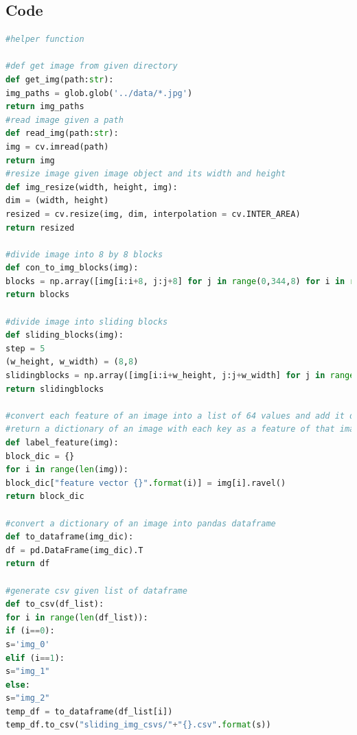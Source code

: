 \documentclass{article}
\begin{document}
\subsection{Code}
\begin{lstlisting}[language=Python]
#helper function

#def get image from given directory
def get_img(path:str):
img_paths = glob.glob('../data/*.jpg')
return img_paths
#read image given a path
def read_img(path:str):
img = cv.imread(path)
return img
#resize image given image object and its width and height
def img_resize(width, height, img):
dim = (width, height)
resized = cv.resize(img, dim, interpolation = cv.INTER_AREA)
return resized

#divide image into 8 by 8 blocks
def con_to_img_blocks(img):
blocks = np.array([img[i:i+8, j:j+8] for j in range(0,344,8) for i in range(0,256,8)]) #iteratre over height and then width
return blocks

#divide image into sliding blocks
def sliding_blocks(img):
step = 5
(w_height, w_width) = (8,8)
slidingblocks = np.array([img[i:i+w_height, j:j+w_width] for j in range(0, img.shape[1]-w_width, step) for i in range(0,img.shape[0]-w_height, step)])
return slidingblocks

#convert each feature of an image into a list of 64 values and add it dictionary with key:feature# and value:list of values of length 64
#return a dictionary of an image with each key as a feature of that image
def label_feature(img):
block_dic = {}
for i in range(len(img)):
block_dic["feature vector {}".format(i)] = img[i].ravel()
return block_dic

#convert a dictionary of an image into pandas dataframe
def to_dataframe(img_dic):
df = pd.DataFrame(img_dic).T
return df

#generate csv given list of dataframe
def to_csv(df_list):
for i in range(len(df_list)):
if (i==0):
s='img_0'
elif (i==1):
s="img_1"
else:
s="img_2"
temp_df = to_dataframe(df_list[i])
temp_df.to_csv("sliding_img_csvs/"+"{}.csv".format(s))
\end{lstlisting}
\end{document}
